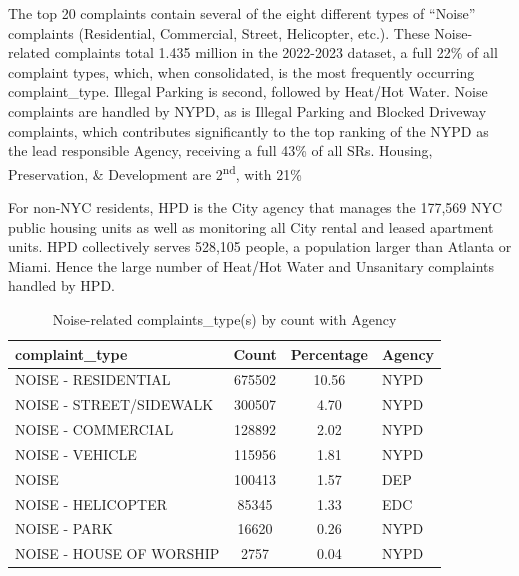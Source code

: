 \documentclass[12pt, titlepage]{article}
\begin{document}
The top 20 complaints contain several of the eight different types of ``Noise'' complaints (Residential, Commercial, Street, Helicopter, etc.). These Noise-related
complaints total 1.435 million in the 2022-2023 dataset, a full 22\% of all complaint types, which, when consolidated, is the most frequently occurring complaint\_type.
Illegal Parking is second, followed by Heat/Hot Water. Noise complaints are handled by NYPD, as is Illegal Parking and Blocked Driveway complaints, which contributes
significantly to the top ranking of the NYPD as the lead responsible Agency, receiving a full 43\% of all SRs. 
Housing, Preservation, \& Development are 2\textsuperscript{nd}, with 21\%

For  non-NYC residents, HPD is the City agency that manages the 177,569 NYC public housing units as well as monitoring
all City rental and leased apartment units. HPD collectively serves 528,105 people, a population larger than Atlanta or Miami. 
Hence the large number of Heat/Hot Water and Unsanitary complaints handled by HPD. 




\begin{table}[tbp]
    \centering
    \caption{Noise-related complaints\_type(s) by count with Agency}
    \normalsize
    \begin{tabular}{@{}lS[table-format=7.0,round-mode=places,round-precision=0]S[table-format=2.2,round-mode=places,round-precision=2]l@{}} %
        \toprule
        \textbf{complaint\_type} & \textbf{Count} & \textbf{Percentage} & \textbf{Agency} \\ 
        \midrule
        NOISE - RESIDENTIAL        & 675502 & 10.56 & NYPD  \\ 
        NOISE - STREET/SIDEWALK    & 300507 &  4.70 & NYPD  \\ 
        NOISE - COMMERCIAL         & 128892 &  2.02 & NYPD  \\ 
        NOISE - VEHICLE            & 115956 &  1.81 & NYPD  \\ 
        NOISE                      & 100413 &  1.57 & DEP   \\ 
        NOISE - HELICOPTER         &  85345 &  1.33 & EDC   \\ 
        NOISE - PARK               &  16620 &  0.26 & NYPD  \\ 
        NOISE - HOUSE OF WORSHIP   &   2757 &  0.04 & NYPD  \\ 
        \bottomrule
    \end{tabular}
    \label{tab:noisecomplaints}
\end{table}
\end{document}
